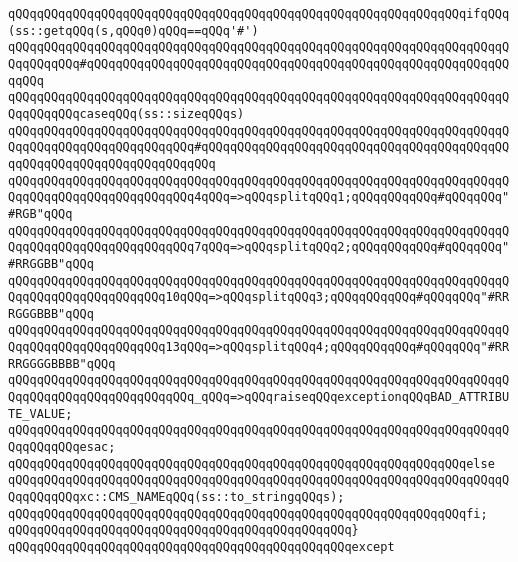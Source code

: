 \newline
\verb|qQQqqQQqqQQqqQQqqQQqqQQqqQQqqQQqqQQqqQQqqQQqqQQqqQQqqQQqqQQqqQQqifqQQq(ss::getqQQq(s,qQQq0)qQQq==qQQq'#')|\newline
\verb|qQQqqQQqqQQqqQQqqQQqqQQqqQQqqQQqqQQqqQQqqQQqqQQqqQQqqQQqqQQqqQQqqQQqqQQqqQQqqQQq#qQQqqQQqqQQqqQQqqQQqqQQqqQQqqQQqqQQqqQQqqQQqqQQqqQQqqQQqqQQqqQQq|\newline
\verb|qQQqqQQqqQQqqQQqqQQqqQQqqQQqqQQqqQQqqQQqqQQqqQQqqQQqqQQqqQQqqQQqqQQqqQQqqQQqqQQqcaseqQQq(ss::sizeqQQqs)|\newline
\verb|qQQqqQQqqQQqqQQqqQQqqQQqqQQqqQQqqQQqqQQqqQQqqQQqqQQqqQQqqQQqqQQqqQQqqQQqqQQqqQQqqQQqqQQqqQQqqQQq#qQQqqQQqqQQqqQQqqQQqqQQqqQQqqQQqqQQqqQQqqQQqqQQqqQQqqQQqqQQqqQQqqQQqqQQq|\newline
\verb|qQQqqQQqqQQqqQQqqQQqqQQqqQQqqQQqqQQqqQQqqQQqqQQqqQQqqQQqqQQqqQQqqQQqqQQqqQQqqQQqqQQqqQQqqQQqqQQq4qQQq=>qQQqsplitqQQq1;qQQqqQQqqQQq#qQQqqQQq"#RGB"qQQq|\newline
\verb|qQQqqQQqqQQqqQQqqQQqqQQqqQQqqQQqqQQqqQQqqQQqqQQqqQQqqQQqqQQqqQQqqQQqqQQqqQQqqQQqqQQqqQQqqQQqqQQq7qQQq=>qQQqsplitqQQq2;qQQqqQQqqQQq#qQQqqQQq"#RRGGBB"qQQq|\newline
\verb|qQQqqQQqqQQqqQQqqQQqqQQqqQQqqQQqqQQqqQQqqQQqqQQqqQQqqQQqqQQqqQQqqQQqqQQqqQQqqQQqqQQqqQQqqQQq10qQQq=>qQQqsplitqQQq3;qQQqqQQqqQQq#qQQqqQQq"#RRRGGGBBB"qQQq|\newline
\verb|qQQqqQQqqQQqqQQqqQQqqQQqqQQqqQQqqQQqqQQqqQQqqQQqqQQqqQQqqQQqqQQqqQQqqQQqqQQqqQQqqQQqqQQqqQQq13qQQq=>qQQqsplitqQQq4;qQQqqQQqqQQq#qQQqqQQq"#RRRRGGGGBBBB"qQQq|\newline
\newline
\verb|qQQqqQQqqQQqqQQqqQQqqQQqqQQqqQQqqQQqqQQqqQQqqQQqqQQqqQQqqQQqqQQqqQQqqQQqqQQqqQQqqQQqqQQqqQQqqQQq_qQQq=>qQQqraiseqQQqexceptionqQQqBAD_ATTRIBUTE_VALUE;|\newline
\verb|qQQqqQQqqQQqqQQqqQQqqQQqqQQqqQQqqQQqqQQqqQQqqQQqqQQqqQQqqQQqqQQqqQQqqQQqqQQqqQQqesac;|\newline
\verb|qQQqqQQqqQQqqQQqqQQqqQQqqQQqqQQqqQQqqQQqqQQqqQQqqQQqqQQqqQQqqQQqelse|\newline
\verb|qQQqqQQqqQQqqQQqqQQqqQQqqQQqqQQqqQQqqQQqqQQqqQQqqQQqqQQqqQQqqQQqqQQqqQQqqQQqqQQqxc::CMS_NAMEqQQq(ss::to_stringqQQqs);|\newline
\verb|qQQqqQQqqQQqqQQqqQQqqQQqqQQqqQQqqQQqqQQqqQQqqQQqqQQqqQQqqQQqqQQqfi;|\newline
\verb|qQQqqQQqqQQqqQQqqQQqqQQqqQQqqQQqqQQqqQQqqQQqqQQq}|\newline
\verb|qQQqqQQqqQQqqQQqqQQqqQQqqQQqqQQqqQQqqQQqqQQqqQQqexcept|\newline
